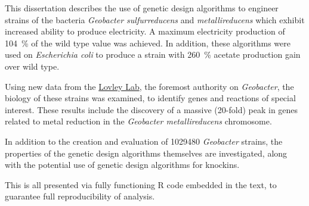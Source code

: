 This dissertation describes the use of genetic design algorithms to engineer strains of the bacteria \textit{Geobacter sulfurreducens} and \textit{metallireducens} which exhibit increased ability to produce electricity. 
A maximum electricity production of \SI{104}{\percent} of the wild type value was achieved.
In addition, these algorithms were used on \textit{Escherichia coli} to produce a strain with \SI{260}{\percent} acetate production gain over wild type.

Using new data from the \href{http://www.geobacter.org/}{Lovley Lab}, the foremost authority on \textit{Geobacter}, the biology of these strains was examined, to identify genes and reactions of special interest. These results include the discovery of a massive (20-fold) peak in genes related to metal reduction in the \textit{Geobacter metallireducens} chromosome.

In addition to the creation and evaluation of \num{1029480} \textit{Geobacter} strains, the properties of the genetic design algorithms themselves are investigated, along with the potential use of genetic design algorithms for knockins.

This is all presented via fully functioning R code embedded in the text, to guarantee full reproducibility of analysis. 